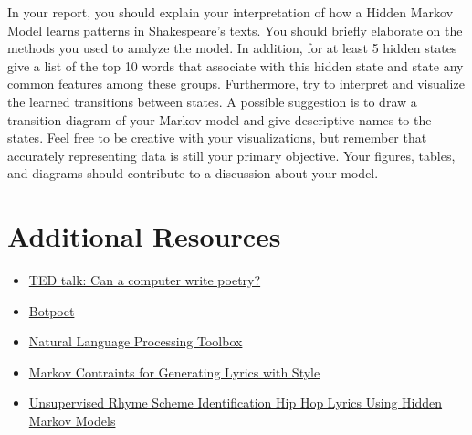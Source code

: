 \begin{report}
    In your report, you should explain your interpretation of how a Hidden Markov Model learns patterns in Shakespeare's texts. You should briefly elaborate on the methods you used to analyze the model. In addition, for at least 5 hidden states give a list of the top 10 words that associate with this hidden state and state any common features among these groups. Furthermore, try to interpret and visualize the learned transitions between states. A possible suggestion is to draw a transition diagram of your Markov model and give descriptive names to the states. Feel free to be creative with your visualizations, but remember that accurately representing data is still your primary objective. Your figures, tables, and diagrams should contribute to a discussion about your model.
\end{report}

\section{Additional Resources}
\begin{itemize}
    \item \href{https://www.ted.com/talks/oscar_schwartz_can_a_computer_write_poetry?language=en}{TED talk: Can a computer write poetry?}
    \item \href{http://botpoet.com/what-is-computer-poetry/}{Botpoet}
    \item \href{http://www.nltk.org/}{Natural Language Processing Toolbox}
    \item \href{https://www.csl.sony.fr/downloads/papers/2012/barbieri-12a.pdf}{Markov Contraints for Generating Lyrics with Style}
    \item \href{http://link.springer.com/chapter/10.1007%2F978-3-642-39593-2_3}{Unsupervised Rhyme Scheme Identification Hip Hop Lyrics Using Hidden Markov Models}
\end{itemize}


